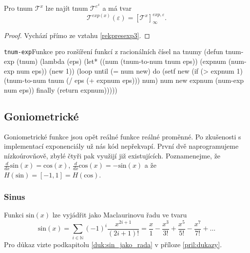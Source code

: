 \begin{consequence}\label{dusl:expotnumu}
Pro tnum $\mathcal{T}^x$ lze najít tnum $\mathcal{T}^{e^x}$ a má tvar
\begin{equation}
\mathcal{T}^{exp(x)}(\varepsilon)=\left[\mathcal{T}^x\right]_\infty^{exp,\varepsilon}.
\end{equation}
\begin{proof}
Vychází přímo ze vztahu \ref{rekpresexp3}.
\end{proof}
\end{consequence}

\begin{lispcode}{\texttt{tnum-exp}}{Funkce pro rozšíření funkcí z racionálních čísel na tnumy}
(\textcolor{funkcionalni}{defun} \textcolor{pojmenovan}{tnum-exp} (tnum)
  (\textcolor{funkcionalni}{lambda} (eps)
    (\textcolor{vedlejsi}{let*} ((num (\textcolor{moje}{tnum-to-num} tnum eps))
          (expnum (\textcolor{moje}{num-exp} num eps))
          (new 1))
      (\textcolor{funkcionalni}{loop} 
        \textcolor{obarvi}{until} (\textcolor{matematicke}{=} num new)
        \textcolor{obarvi}{do} (\textcolor{vedlejsi}{setf} new (\textcolor{funkcionalni}{if} (\textcolor{matematicke}{>} expnum 1)
              (\textcolor{moje}{tnum-to-num} tnum (\textcolor{matematicke}{/} eps (\textcolor{matematicke}{+} expnum eps)))
              num)
          num new
          expnum (\textcolor{moje}{num-exp} num eps))
        \textcolor{obarvi}{finally} (\textcolor{funkcionalni}{return} expnum)))))
\end{lispcode}

\subsection{Goniometrické}
Goniometrické funkce jsou opět reálné funkce reálné proměnné. Po zkušenosti s implementací exponenciály už nás kód nepřekvapí. První dvě naprogramujeme nízkoúrovňově, zbylé čtyři pak využijí již existujících. Poznamenejme, že $\frac{d}{dx}\mathrm{sin}(x) = \mathrm{cos}(x)$, $\frac{d}{dx}\mathrm{cos}(x) = -\mathrm{sin}(x)$ a že $H(\mathrm{sin}) = [-1,1] = H(\mathrm{cos})$.

\subsubsection{Sinus}
\begin{fact}\label{vet:sin_jako_rada}
Funkci $\mathrm{sin}(x)$ lze vyjádřit jako Maclaurinovu řadu ve tvaru
\begin{equation}
\mathrm{sin}(x) =\sum_{i \in \mathbb{N}} (-1)^i \frac{x^{2i+1}}{(2i+1)!} =\frac{x}{1} - \frac{x^3}{3!} + \frac{x^5}{5!} - \frac{x^7}{7!} + \ldots
\end{equation}
Pro důkaz vizte podkapitolu \ref{duk:sin_jako_rada} v příloze \ref{pril:dukazy}.
\end{fact}


